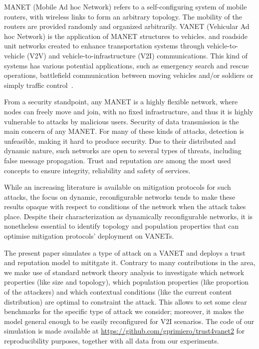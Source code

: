 \documentclass[compsoc, conference, letterpaper, 10pt, times]{IEEEtran}
\begin{document}
MANET (Mobile Ad hoc Network) refers to a self-configuring system of mobile routers, with wireless links to form an arbitrary topology. The mobility of the routers are provided randomly and organized arbitrarily. VANET (Vehicular Ad hoc Network) is the application of MANET structures to vehicles. and roadside unit networks created to enhance transportation systems through vehicle-to-vehicle (V2V) and vehicle-to-infrastructure (V2I) communications. This kind of systems has various potential applications, such as emergency search and rescue operations, battlefield
communication between moving vehicles and/or soldiers or simply traffic control~\cite{survey1,survey2}.

From a security standpoint, any MANET is a highly flexible network, where nodes can freely move and join, with no fixed infrastructure, and thus it is highly vulnerable to attacks by malicious users. Security of data transmission is the main concern of any MANET. For many of these kinds of attacks, detection is unfeasible, making it hard to produce security. Due to their distributed and dynamic nature, such networks are open to several types of threats, including false message propagation. Trust and reputation are among the  most used concepts to ensure integrity, reliability and safety of services.

While an increasing literature is available on mitigation protocols for such attacks, the focus on dynamic, reconfigurable networks tends to make these results opaque with respect to conditions of the network when the attack takes place. Despite their characterization as dynamically reconfigurable networks, it is nonetheless essential to identify topology and population properties that can optimise mitigation protocols' deployment on VANETs.

The present paper simulates a type of attack on a VANET and deploys a trust and reputation model to mititgate it. Contrary to many contributions in the area, we make use of standard network theory analysis to investigate which network properties (like size and topology), which population properties (like proportion of the attackers) and which contextual conditions (like the current content distribution) are optimal to constraint the attack. This allows to set some clear benchmarks for the specific type of attack we consider; moreover, it makes the model general enough to be easily reconfigured for V2I scenarios. The code of our simulation is made available at \url{https://github.com/gprimiero/trust4vanet2} for reproducibility purposes, together with all data from our experiments.
\end{document}
